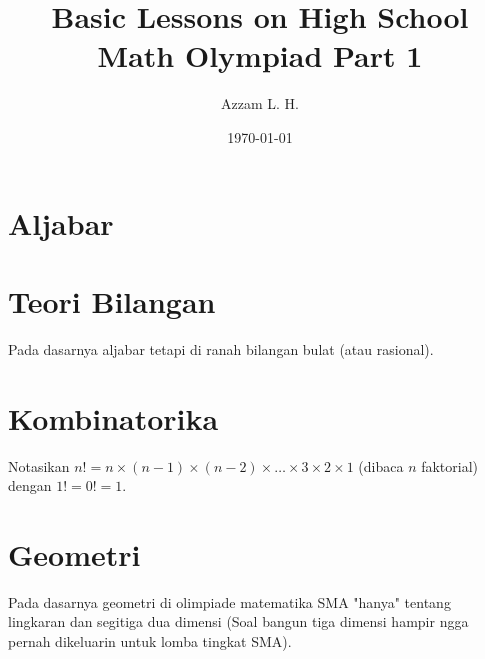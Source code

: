 \title{Basic Lessons on High School Math Olympiad Part 1}
\date{\today}
\author{Azzam L. H.}
\maketitle
\renewcommand*\contentsname{Daftar Isi}
\tableofcontents

\newpage
\section{Aljabar}



\newpage
\section{Teori Bilangan}
Pada dasarnya aljabar tetapi di ranah bilangan bulat (atau rasional).




        
\newpage    
\section{Kombinatorika}

Notasikan $n!=n \times (n-1) \times (n-2) \times \dots \times 3 \times 2 \times 1$ (dibaca $n$ faktorial) dengan $1!=0!=1$.





\newpage
\section{Geometri}
Pada dasarnya geometri di olimpiade matematika SMA "hanya" tentang lingkaran dan segitiga dua dimensi (Soal bangun tiga dimensi hampir ngga pernah dikeluarin untuk lomba tingkat SMA).





